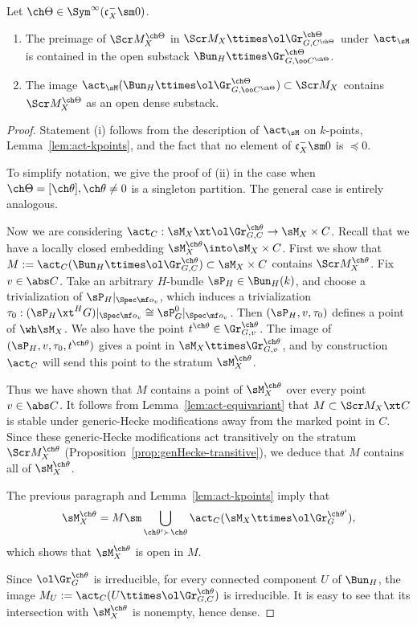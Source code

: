\begin{lem}
\notready \label{lem:actimage}
Let $\ch\Theta \in \Sym^\infty(\mathfrak c_X^- \sm 0)$.
\begin{enumerate}
\item
The preimage of $\Scr M^{\ch\Theta}_X$ in
$\Scr M_{X} \ttimes \ol\Gr^{\ch\Theta}_{G,C^{\ch\Theta}}$
under $\act_\sM$
is contained in the open substack
$\Bun_H \ttimes \Gr^{\ch\Theta}_{G,\oo C^{\ch\Theta}}$.

\item
The image $\act_\sM(\Bun_H \ttimes \ol\Gr^{\ch\Theta}_{G,\oo C^{\ch\Theta}}) \subset \Scr M_X$ contains $\Scr M_X^{\ch\Theta}$ as an open dense substack.
\end{enumerate}
\end{lem}
\begin{proof}
Statement (i) follows from the description of
$\act_\sM$ on $k$-points, Lemma~\ref{lem:act-kpoints}, and the fact that no element of $\mathfrak c_X^- \sm 0$ is $ \preceq 0 $.

To simplify notation, we give the proof of (ii) in the case when
 $\ch\Theta = [\ch\theta], \ch\theta\ne 0$ is a singleton partition.
The general case is entirely analogous.

Now we are considering $\act_C : \sM_X \xt \ol\Gr^{\ch\theta}_{G,C} \to \sM_X \times C$.
Recall that we have a
locally closed embedding $\sM_X^{\ch\theta} \into \sM_X \times C$.
First we show that
$M:=\act_C(\Bun_H \ttimes \ol\Gr^{\ch\theta}_{G,C}) \subset \sM_X\times C$ contains
$\Scr M^{\ch\theta}_X$.
Fix $v\in \abs C$.
Take an arbitrary $H$-bundle $\sP_H \in \Bun_H(k)$,
and choose a trivialization of $\sP_H|_{\Spec \mf o_v}$, which
induces a trivialization $\tau_0 : (\sP_H \xt^H G)|_{\Spec \mf o_v} \cong \sP_G^0|_{\Spec \mf o_v}$.
Then $(\sP_H,v,\tau_0)$ defines a point of $\wh\sM_X$.
We also have the point $t^{\ch\theta} \in \Gr^{\ch\theta}_{G,v}$.
The image of $(\sP_H,v,\tau_0, t^{\ch\theta})$ gives a point in
$\sM_X \ttimes \Gr^{\ch\theta}_{G,v}$,
and by construction $\act_C$ will send this point to the stratum $\sM^{\ch\theta}_X$.

Thus we have shown that
$M$ contains a point of $\sM^{\ch\theta}_X$ over every point $v\in \abs C$.
It follows from Lemma~\ref{lem:act-equivariant} that
$M \subset \Scr M_X \xt C$
is stable under
generic-Hecke modifications away from the marked point in $C$.
Since these generic-Hecke modifications act transitively on
the stratum $\Scr M^{\ch\theta}_X$ (Proposition~\ref{prop:genHecke-transitive}), we
deduce that $M$ contains all of $\sM^{\ch\theta}_X$.

The previous paragraph and Lemma~\ref{lem:act-kpoints} imply that
\[ \sM_X^{\ch\theta} = M \sm \bigcup_{\ch\theta' \succ \ch\theta} \act_C(\sM_X \ttimes \ol\Gr^{\ch\theta'}_G), \]
which shows that $\sM_X^{\ch\theta}$ is open in $M$.


Since $\ol\Gr^{\ch\theta}_G$ is irreducible,
for every connected component $U$ of $\Bun_H$,
the image $M_U := \act_C(U \ttimes \ol\Gr^{\ch\theta}_{G,C})$ is
irreducible.
It is easy to see that its intersection with
$\sM_X^{\ch\theta}$ is nonempty, hence dense.
\end{proof}

